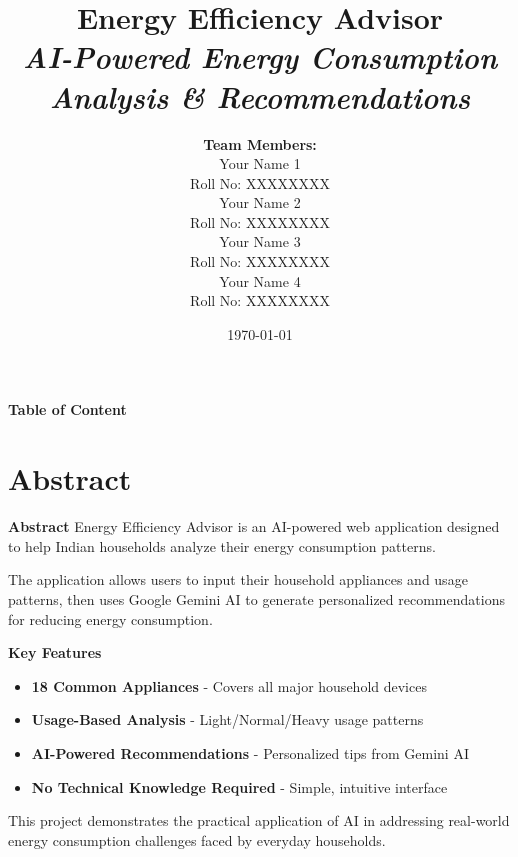 \documentclass[11pt,aspectratio=169,notes,mathserif]{beamer}
\title[]{%
    \textbf{Energy Efficiency Advisor} \\[0.5cm]
    \textit{AI-Powered Energy Consumption Analysis \& Recommendations}
}
\author[]{%
    \textbf{Team Members:} \\
    \vspace{0.3cm}
    {\small Your Name 1 \\ Roll No: XXXXXXXX} \\[0.2cm]
    {\small Your Name 2 \\ Roll No: XXXXXXXX} \\[0.2cm]
    {\small Your Name 3 \\ Roll No: XXXXXXXX} \\[0.2cm]
    {\small Your Name 4 \\ Roll No: XXXXXXXX}
}
\institute[]{%
    \textbf{Under the Guidance of} \\[0.3cm]
    \textbf{Dr. [Guide Name]} \\
    \textbf{Associate Professor,} \\
    \textbf{Dept of [Your Department],} \\
    \textbf{[Your College Name]}
}
\date{\today}
\begin{document}
\begin{frame}[plain]
    \maketitle
\end{frame}

\begin{frame}{\textbf{Table of Content}}
    \tableofcontents
\end{frame}

\section{Abstract}
\begin{frame}{\textbf{Abstract}}
    \justifying
    Energy Efficiency Advisor is an AI-powered web application designed to help Indian households analyze their energy consumption patterns. 
    
    The application allows users to input their household appliances and usage patterns, then uses Google Gemini AI to generate personalized recommendations for reducing energy consumption.
    
    \begin{block}{\textbf{Key Features}}
        \begin{itemize}
            \item \textbf{18 Common Appliances} - Covers all major household devices
            \item \textbf{Usage-Based Analysis} - Light/Normal/Heavy usage patterns
            \item \textbf{AI-Powered Recommendations} - Personalized tips from Gemini AI
            \item \textbf{No Technical Knowledge Required} - Simple, intuitive interface
        \end{itemize}
    \end{block}
    
    This project demonstrates the practical application of AI in addressing real-world energy consumption challenges faced by everyday households.
\end{frame}
\end{document}
